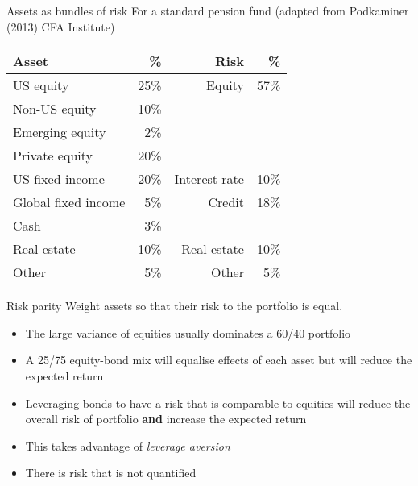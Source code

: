 \documentclass[14pt,xcolor=pdftex,dvipsnames,table]{beamer}\usepackage[]{graphicx}\usepackage[]{color}
\begin{document}
\begin{frame}{Assets as bundles of risk}
For a standard pension fund (adapted from Podkaminer (2013) CFA Institute)
\begin{table}
\begin{center}
\begin{tabular}{l r r r}
\textbf{Asset} & \textbf{\%} & \textbf{Risk} & \textbf{\%}\\
\hline
US equity     & 25\% & Equity & 57\% \\
Non-US equity & 10\% & & \\
Emerging equity & 2\% & & \\
Private equity  & 20\% &  &  \\
\hline
US fixed income & 20\% & Interest rate&  10\%\\
Global fixed income & 5\% & Credit & 18\%\\
Cash            & 3\% & &  \\

Real estate     & 10\% & Real estate & 10\%\\
Other           & 5\% & Other & 5\% \\
\end{tabular}
\end{center}
\end{table}

\end{frame}


\begin{frame}{Risk parity}
Weight assets so that their risk to the portfolio is equal.  
\begin{itemize}[<+-| alert@+>]
\pause
\item The large variance of equities usually dominates a 60/40 portfolio
\item A 25/75 equity-bond mix will equalise effects of each asset but will reduce the expected return
\item Leveraging bonds to have a risk that is comparable to equities will reduce the overall risk of portfolio \textbf{and} increase the expected return
\item This takes advantage of \emph{leverage aversion}
\item There is risk that is not quantified
\end{itemize}
\end{frame}
\end{document}
